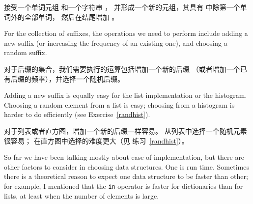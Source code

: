  接受一个单词元组  和一个字符串  ，
并形成一个新的元组，其具有  中除第一个单词外的全部单词，
然后在结尾增加  。

For the collection of suffixes, the operations we need to
perform include adding a new suffix (or increasing the frequency
of an existing one), and choosing a random suffix.

对于后缀的集合，我们需要执行的运算包括增加一个新的后缀
（或者增加一个已有后缀的频率），并选择一个随机后缀。

Adding a new suffix is equally easy for the list implementation
or the histogram.  Choosing a random element from a list
is easy; choosing from a histogram is harder to do
efficiently (see Exercise~\ref{randhist}).

对于列表或者直方图，增加一个新的后缀一样容易。
从列表中选择一个随机元素很容易；
在直方图中选择的难度更大（见 练习~\ref{randhist}）。

So far we have been talking mostly about ease of implementation,
but there are other factors to consider in choosing data structures.
One is run time.  Sometimes there is a theoretical reason to expect
one data structure to be faster than other; for example, I mentioned
that the {\tt in} operator is faster for dictionaries than for lists,
at least when the number of elements is large.

